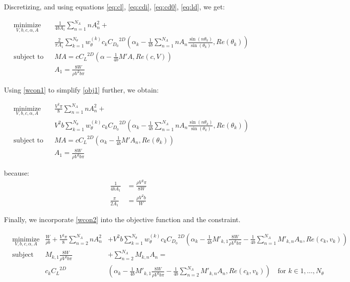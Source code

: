 \documentclass[letterpaper,12pt]{article}
\begin{document}
Discretizing, and using equations \ref{eq:cl}, \ref{eq:cdi}, \ref{eq:cd0}, \ref{eq:ld}, we get:


\begin{align}
	& \underset{V, b, c, \alpha, A}{\text{minimize}}
	& & \frac {1}{4bA_1} \sum_{n=1}^{N_A} n A_{n}^2 + \nonumber \\
	&&& \frac 2 {\pi A_1} \sum_{k=1}^{N_{\theta}} w_{\theta}^{(k)} c_k {C_{D_0}}^{2D}\left( 
		\alpha_k - 
		\frac {1}{4b} \sum_{n=1}^{N_A} n A_n \frac{ \sin(n\theta_k) }{\sin(\theta_k)} , Re(\theta_k)
		\right) \label{obj1} \\
	& \text{subject to}
	& & MA = c {C_L}^{2D} \left( \alpha - \frac {1}{4b} M' A , Re(c, V)\right)   \label{llcon1}\\
	& &  & A_1 = \frac{8W}{\rho V^2 b \pi} \label{wcon1}
\end{align}

Using \ref{wcon1} to simplify \ref{obj1} further, we obtain:

\begin{align}
	& \underset{V, b, c, \alpha, A}{\text{minimize}}
	& & \frac{V^2 \pi}{8}\sum_{n=1}^{N_A} n A_{n}^2 + \nonumber \\
	&&&  V^2 b  \sum_{k=1}^{N_{\theta}} w_{\theta}^{(k)} c_k {C_{D_0}}^{2D}\left( 
		\alpha_k - 
		\frac {1}{4b} \sum_{n=1}^{N_A} n A_n \frac{ \sin(n\theta_k) }{\sin(\theta_k)} , Re(\theta_k)
		\right) \label{obj2} \\
	& \text{subject to}
	& & MA = c {C_L}^{2D} \left( \alpha_k - \frac {1}{4b} M' A_n , Re(\theta_k)\right)  \label{llcon2}\\
	& &  & A_1 = \frac{8W}{\rho V^2 b \pi} \label{wcon2}
\end{align}

because:
\begin{align*}
	\frac{1}{4bA_1} &= \frac{\rho V^2 \pi}{8W} \\
	\frac{\pi}{2A_1} &= \frac{\rho V^2 b}{ W} 
\end{align*}

Finally, we incorporate \ref{wcon2} into the objective function and the constraint.

\begin{align*}
	& \underset{V, b, c, \alpha, A}{\text{minimize}} &
	\frac{W}{\rho b} + \frac{V^2 \pi}{8}\sum_{n=2}^{N_A} n A_{n}^2 &+
	  V^2 b  \sum_{k=1}^{N_{\theta}} w_{\theta}^{(k)} c_k {C_{D_0}}^{2D}
	  \left( \alpha_k
	  - \frac {1}{4b} M'_{k,1}\frac{8W}{\rho V^2 b \pi}
	  - \frac {1}{4b}\sum_{n=1}^{N_{A}}M'_{k,n}A_n , Re(c_k, v_k)
	  \right)\\
	& \text{subject to} &
 	M_{k, 1} \frac{8W}{\rho V^2 b \pi} &+ \sum_{n=2}^{N_{A}} M_{k,n} A_n = \\
	& & c_k{C_L}^{2D} & \left( \alpha_k
		 - \frac {1}{4b} M'_{k,1}\frac{8W}{\rho V^2 b \pi}
		 - \frac {1}{4b}\sum_{n=2}^{N_{A}}M'_{k,n}A_n , Re(c_k, v_k)\right)
		 \quad \text{for } k \in 1,\dots, N_{\theta}
\end{align*}
\end{document}
